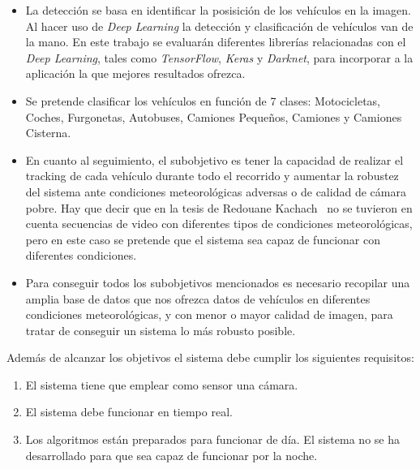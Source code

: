 \begin{itemize}
    \item La detección se basa en identificar la posisición de los vehículos en la imagen. Al hacer uso de \textit{Deep Learning} la detección y clasificación de vehículos van de la mano. En este trabajo se evaluarán diferentes  librerías relacionadas con el \textit{Deep Learning}, tales como \textit{TensorFlow}, \textit{Keras} y \textit{Darknet}, para incorporar a la aplicación la que mejores resultados ofrezca.
    \item Se pretende clasificar los vehículos en función de 7 clases: Motocicletas, Coches, Furgonetas, Autobuses, Camiones Pequeños, Camiones y Camiones Cisterna. 
    \item En cuanto al seguimiento, el subobjetivo es tener la capacidad de realizar el tracking de cada vehículo durante todo el recorrido y aumentar la robustez del sistema ante condiciones meteorológicas adversas o de calidad de cámara pobre. Hay que decir que en la tesis de Redouane Kachach~\cite{redo_tesis} no se tuvieron en cuenta secuencias de video con diferentes tipos de condiciones meteorológicas, pero en este caso se pretende que el sistema sea capaz de funcionar con diferentes condiciones.  
    \item Para conseguir todos los subobjetivos mencionados es necesario recopilar una amplia base de datos que nos ofrezca datos de vehículos en diferentes condiciones meteorológicas, y con menor o mayor calidad de imagen, para tratar de conseguir un sistema lo más robusto posible.
\end{itemize}


Además de alcanzar los objetivos el sistema debe cumplir los siguientes requisitos:
\begin{enumerate}
    \item El sistema tiene que emplear como sensor una cámara.
    \item El sistema debe funcionar en tiempo real.
    \item  Los algoritmos están preparados para funcionar de día. El sistema no se ha desarrollado para que sea capaz de funcionar por la noche.
\end{enumerate}
